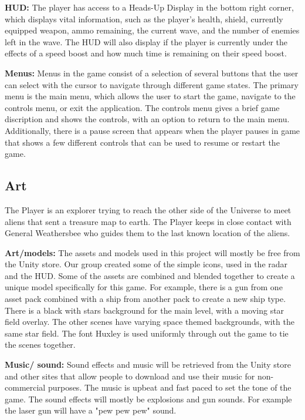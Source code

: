 \documentclass[12pt]{article}       %
\def\hs{\hspace{15pt}}
\begin{document}
	{\bf HUD:} The player has access to a Heads-Up Display in the bottom right corner, which displays vital information, such as the player's health, shield, currently equipped weapon, ammo remaining, the current wave, and the number of enemies left in the wave. The HUD will also display if the player is currently under the effects of a speed boost and how much time is remaining on their speed boost.

	{\bf Menus:} Menus in the game consist of a selection of several buttons that the user can select with the cursor to navigate through different game states. The primary menu is the main menu, which allows the user to start the game, navigate to the controls menu, or exit the application. The controls menu gives a brief game discription and shows the controls, with an option to return to the main menu. Additionally, there is a pause screen that appears when the player pauses in game that shows a few different controls that can be used to resume or restart the game.

\subsection{Art} %

	\hs {\bf Story:} The Player is an explorer trying to reach the other side of the Universe to meet aliens that sent a treasure map to earth. The Player keeps in close contact with General Weathersbee who guides them to the last known location of the aliens. 

	{\bf Art/models:} The assets and models used in this project will mostly be free from the Unity store. Our group created some of the simple icons, used in the radar and the HUD. Some of the assets are combined and blended together to create a unique model specifically for this game. For example, there is a gun from one asset pack combined with a ship from another pack to create a new ship type. There is a black with stars background for the main level, with a moving star field overlay. The other scenes have varying space themed backgrounds, with the same star field. The font Huxley is used uniformly through out the game to tie the scenes together.  

	{\bf Music/ sound:} Sound effects and music will be retrieved from the Unity store and other sites that allow people to download and use their music for non-commercial purposes. The music is upbeat and fast paced to set the tone of the game. The sound effects will mostly be explosions and gun sounds. For example the laser gun will have a "pew pew pew" sound. 
\end{document}
